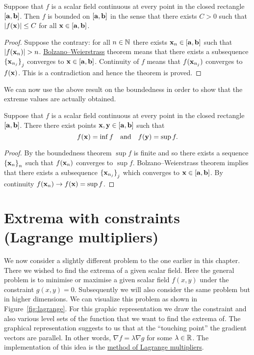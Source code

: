 \begin{theorem}
    Suppose that \(f\) is a scalar field continuous at every point in the closed rectangle \([\mathbf{a},\mathbf{b}]\).
    Then \(f\) is bounded on \([\mathbf{a},\mathbf{b}]\) in the sense that there exists \(C>0\) such that \(\left|f(\mathbf{x})\right| \leq C\) for all \(\mathbf{x} \in [\mathbf{a},\mathbf{b}]\).
\end{theorem}

\begin{proof}
    Suppose the contrary: for all \(n\in\mathbb{N}\) there exists \(\mathbf{x}_n\in [\mathbf{a},\mathbf{b}]\) such that \(\abs{f(\xx_n)}>n\).
    \href{https://en.wikipedia.org/wiki/Bolzano%E2%80%93Weierstrass_theorem}{Bolzano–Weierstrass} theorem means that there exists a subsequence \({\{\mathbf{x}_{n_j}\}}_{j}\) converges to \( \mathbf{x} \in [\mathbf{a},\mathbf{b}]\).
    Continuity of \(f\) means that \(f(\mathbf{x}_{n_j})\) converges to \(f(\mathbf{x})\). This is a contradiction and hence the theorem is proved.
\end{proof}


We can now use the above result on the boundedness in order to show that the  extreme values are actually obtained.

\begin{theorem}
    Suppose that \(f\) is a scalar field continuous at every point in the closed rectangle \([\mathbf{a},\mathbf{b}]\).
    There there exist points \( \mathbf{x}, \mathbf{y} \in [\mathbf{a},\mathbf{b}]\) such that
    \[
        f(\mathbf{x}) = \inf f
        \quad \text{and} \quad
        f(\mathbf{y})= \sup f.
    \]
\end{theorem}

\begin{proof}
    By the boundedness theorem \(\sup f\) is finite and so there exists a sequence  \({\{\mathbf{x}_{n}\}}_{n}\)  such that \(f(\mathbf{x}_n)\) converges to \(\sup f\).
    Bolzano–Weierstrass theorem implies that there exists a subsequence  \({\{\mathbf{x}_{n_j}\}}_{j}\) which converges to \( \mathbf{x} \in [\mathbf{a},\mathbf{b}]\).
    By continuity \(f(\mathbf{x}_n) \to f(\mathbf{x}) = \sup f\).
\end{proof}




\section{Extrema with constraints (Lagrange multipliers)}

We now consider a slightly different problem to the one earlier in this chapter.
There we wished to find the extrema of a given scalar field.
Here the general problem is to minimise or maximise a given scalar field \(f(x,y)\) under the constraint \(g(x,y) = 0\).
Subsequently we will also consider the same problem but in higher dimensions.
We can visualize this problem as shown in Figure~\ref{fig:lagrange}.
For this graphic representation we draw the constraint and also various level sets of the function that we want to find the extrema of.
The graphical representation suggests to us that at the ``touching point'' the gradient vectors are parallel.
In other words, \(\nabla f = \lambda \nabla g\) for some \(\lambda \in \mathbb{R}\).
The implementation of this idea is the \href{https://en.wikipedia.org/wiki/Lagrange_multiplier}{method of Lagrange multipliers}.

